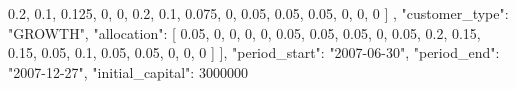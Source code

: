 {{{                    0.2,
                    0.1,
                    0.125,
                    0,
                    0,
                    0.2,
                    0.1,
                    0.075,
                    0,
                    0.05,
                    0.05,
                    0.05,
                    0,
                    0,
                    0
                ]
            },
            {
                "customer_type": "GROWTH",
                "allocation": [
                    0.05,
                    0,
                    0,
                    0,
                    0,
                    0.05,
                    0.05,
                    0.05,
                    0,
                    0.05,
                    0.2,
                    0.15,
                    0.15,
                    0.05,
                    0.1,
                    0.05,
                    0.05,
                    0,
                    0,
                    0
                ]
            }
        ],
        "period_start": "2007-06-30",
        "period_end": "2007-12-27",
        "initial_capital": 3000000
    }
}

